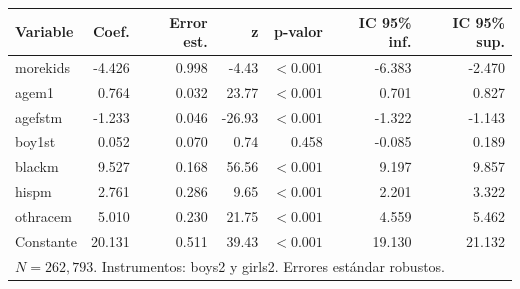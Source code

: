
\begin{tabular}{lrrrrrr}
\toprule
Variable & Coef. & Error est. & z & p-valor & IC 95\% inf. & IC 95\% sup.\\
\midrule
morekids & -4.426 & 0.998 & -4.43 & $<0.001$ & -6.383 & -2.470\\
agem1 & 0.764 & 0.032 & 23.77 & $<0.001$ & 0.701 & 0.827\\
agefstm & -1.233 & 0.046 & -26.93 & $<0.001$ & -1.322 & -1.143\\
boy1st & 0.052 & 0.070 & 0.74 & 0.458 & -0.085 & 0.189\\
blackm & 9.527 & 0.168 & 56.56 & $<0.001$ & 9.197 & 9.857\\
hispm & 2.761 & 0.286 & 9.65 & $<0.001$ & 2.201 & 3.322\\
othracem & 5.010 & 0.230 & 21.75 & $<0.001$ & 4.559 & 5.462\\
Constante & 20.131 & 0.511 & 39.43 & $<0.001$ & 19.130 & 21.132\\
\midrule
\multicolumn{7}{l}{$N=262{,}793$. Instrumentos: boys2 y girls2. Errores estándar robustos.}\\
\bottomrule
\end{tabular}

